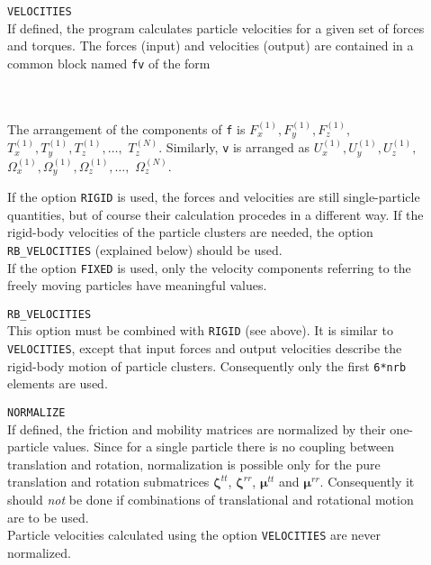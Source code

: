 \documentclass[12pt]{article}
\newcommand{\gtens}[1]{\mathbf{#1}}
\newcommand{\tzeta}{\gtens{\zeta}}
\newcommand{\tmu}{\gtens{\mu}}
\newcommand{\prog}[1]{{\tt #1}}
\newcommand{\wsp}{\hspace*{0.5cm}}
\begin{document}
\begin{description}
\item[]
\prog{VELOCITIES}\\
If defined, the program calculates particle velocities for a given set of
forces and torques. The forces (input) and velocities (output) are
contained in a common block named \prog{fv} of the form\\
\wsp\prog{real f(6*\_NP\_),v(6*\_NP\_)}\\
\wsp\prog{common /fv/ f,v}\\
\begin{sloppy}
The arrangement of the components of \prog{f} is
$F_x^{(1)},F_y^{(1)},F_z^{(1)},$ $T_x^{(1)},T_y^{(1)},T_z^{(1)},
\ldots,$ $T_z^{(N)}$. Similarly, \prog{v} is arranged as
$U_x^{(1)},U_y^{(1)},U_z^{(1)},$ $\Omega_x^{(1)},\Omega_y^{(1)},
\Omega_z^{(1)},\ldots,$ $\Omega_z^{(N)}$.\\
\end{sloppy}
If the option \prog{RIGID} is used, the forces and velocities are still
single-particle quantities, but of course their calculation procedes
in a different way. If the rigid-body velocities of the particle
clusters are needed, the option \prog{RB\_VELOCITIES} (explained below)
should be used.\\
If the option \prog{FIXED} is used, only the velocity components
referring to the freely moving particles have meaningful values.

\item[]
\prog{RB\_VELOCITIES}\\
This option must be combined with \prog{RIGID} (see above).
It is similar to
\prog{VELOCITIES}, except that input forces and output velocities 
describe the rigid-body motion of particle clusters. Consequently
only the first \prog{6*nrb} elements are used.

\item[]
\prog{NORMALIZE}\\
If defined, the friction and mobility matrices are normalized by their
one-particle values. Since for a single particle there is no coupling
between translation and rotation, normalization is possible only for
the pure translation and rotation submatrices $\tzeta^{tt}$,
$\tzeta^{rr}$, $\tmu^{tt}$ and $\tmu^{rr}$. Consequently it should
{\em not} be done if combinations of translational and rotational
motion are to be used.\\
Particle velocities calculated using the option \prog{VELOCITIES} are
never normalized.


\end{description}
\end{document}
